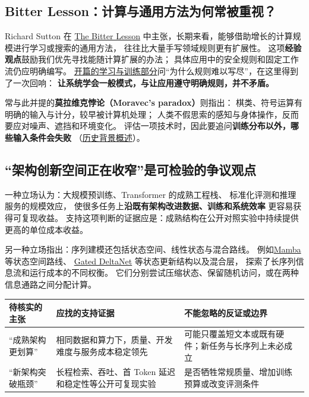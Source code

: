 \subsection{Bitter Lesson：计算与通用方法为何常被重视？}

Richard Sutton 在
\href{http://www.incompleteideas.net/IncIdeas/BitterLesson.html}{The Bitter Lesson}
中主张，长期来看，能够借助增长的计算规模进行学习或搜索的通用方法，
往往比大量手写领域规则更有扩展性。
这项\textbf{经验观点}鼓励我们优先寻找能随计算扩展的办法；
具体应用中的安全规则和固定工作流仍应明确编写。
\hyperref[part:learning]{开篇的学习与训练部分}问“为什么规则难以写尽”，在这里得到了一次回响：
\textbf{让系统学会一般模式，与让应用遵守明确规则，并不矛盾。}

常与此并提的\textbf{莫拉维克悖论（Moravec's paradox）}则指出：
棋类、符号运算有明确的输入与计分，较早被计算机处理；
人类不假思索的感知与身体操作，反而要应对噪声、遮挡和环境变化。
评估一项技术时，因此要追问\textbf{训练分布以外，哪些输入条件会失败}
（\href{https://en.wikipedia.org/wiki/Moravec%27s_paradox}{历史背景概述}）。

\subsection{“架构创新空间正在收窄”是可检验的争议观点}

一种立场认为：大规模预训练、Transformer 的成熟工程栈、
标准化评测和推理服务的规模效应，
使很多任务上\textbf{沿既有架构改进数据、训练和系统效率}
更容易获得可复现收益。
支持这项判断的证据应是：成熟结构在公开对照实验中持续提供更高的单位成本收益。

另一种立场指出：序列建模还包括状态空间、线性状态与混合路线。
例如\href{https://arxiv.org/abs/2312.00752}{Mamba}
等状态空间路线、
\href{https://arxiv.org/abs/2412.06464}{Gated DeltaNet}
等状态更新结构以及混合层，
探索了长序列信息流和运行成本的不同权衡。
它们分别尝试压缩状态、保留随机访问，或在两种信息通路之间分配计算。

\begin{center}\small
{}
\begin{tabularx}{\linewidth}{@{}>{\raggedright\arraybackslash}p{27mm}>{\raggedright\arraybackslash}p{49mm}>{\raggedright\arraybackslash}X@{}}
\toprule
待核实的主张 & 应找的支持证据 & 不能忽略的反证或边界\\\midrule
“成熟架构更划算” &
相同数据和算力下，质量、开发难度与服务成本稳定领先 &
可能只覆盖短文本或既有硬件；新任务与长序列上未必成立\\
“新架构突破瓶颈” &
长程检索、吞吐、首 Token 延迟和稳定性等公开可复现实验 &
是否牺牲常规质量、增加训练预算或改变评测条件\\
\bottomrule
\end{tabularx}
\end{center}

